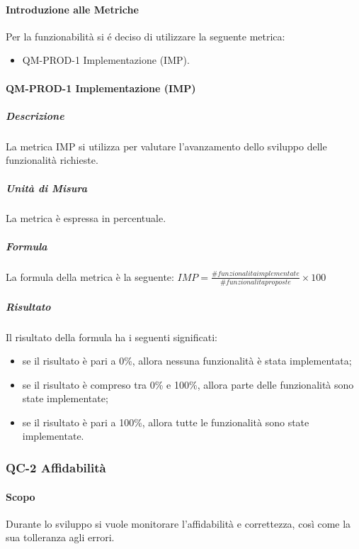 			\paragraph{Introduzione alle Metriche}
				Per la funzionabilità si é deciso di utilizzare la seguente metrica:
				\begin{itemize}
					\item QM-PROD-1 Implementazione (IMP).
				\end{itemize}
			\paragraph{QM-PROD-1 Implementazione (IMP)}
				\subparagraph{Descrizione}
					La metrica IMP si utilizza per valutare l'avanzamento dello sviluppo delle funzionalità richieste.
				\subparagraph{Unità di Misura}
					La metrica è espressa in percentuale.
				\subparagraph{Formula}
					La formula della metrica è la seguente:
					\(
						IMP = \frac{\# funzionalita implementate}{\# funzionalita proposte}\times100
					\)
				\subparagraph{Risultato}
					Il risultato della formula ha i seguenti significati:
					\begin{itemize}
						\item se il risultato è pari a 0\%, allora nessuna funzionalità è stata implementata;
						\item se il risultato è compreso tra 0\% e 100\%, allora parte delle funzionalità sono state implementate;
						\item se il risultato è pari a 100\%, allora tutte le funzionalità sono state implementate.
					\end{itemize}

		\subsubsection{QC-2 Affidabilità}
			\paragraph{Scopo}
				Durante lo sviluppo si vuole monitorare l'affidabilità e correttezza, così come la sua tolleranza agli errori.
